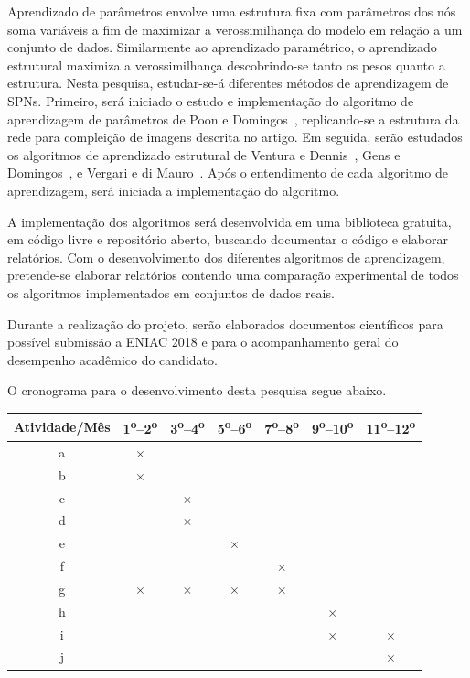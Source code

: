 \documentclass[12pt]{article}
\newcommand{\tsup}{\textsuperscript}
\theoremstyle{plain}
\numberwithin{equation}{section}
\begin{document}
Aprendizado de parâmetros envolve uma estrutura fixa com parâmetros dos nós soma variáveis a fim de
maximizar a verossimilhança do modelo em relação a um conjunto de dados. Similarmente ao
aprendizado paramétrico, o aprendizado estrutural maximiza a verossimilhança descobrindo-se tanto
os pesos quanto a estrutura. Nesta pesquisa, estudar-se-á diferentes métodos de aprendizagem de
SPNs. Primeiro, será iniciado o estudo e implementação do algoritmo de aprendizagem de parâmetros
de Poon e Domingos~\cite{poon-domingos}, replicando-se a estrutura da rede para compleição de
imagens descrita no artigo. Em seguida, serão estudados os algoritmos de aprendizado estrutural
de Ventura e Dennis~\cite{clustering}, Gens e Domingos~\cite{gens-domingos}, e Vergari e di
Mauro~\cite{vergari-mauro}. Após o entendimento de cada algoritmo de aprendizagem, será iniciada a
implementação do algoritmo.

A implementação dos algoritmos será desenvolvida em uma biblioteca gratuita, em código livre e
repositório aberto, buscando documentar o código e elaborar relatórios. Com o desenvolvimento dos
diferentes algoritmos de aprendizagem, pretende-se elaborar relatórios contendo uma comparação
experimental de todos os algoritmos implementados em conjuntos de dados reais.

Durante a realização do projeto, serão elaborados documentos científicos para possível submissão a
ENIAC 2018 e para o acompanhamento geral do desempenho acadêmico do candidato.

O cronograma para o desenvolvimento desta pesquisa segue abaixo.

\begin{table}[h]
  \centering
  \begin{tabular}{|c|c|c|c|c|c|c|}
    \hline
    Atividade/Mês & 1\tsup{o}--2\tsup{o} & 3\tsup{o}--4\tsup{o} & 5\tsup{o}--6\tsup{o} &
    7\tsup{o}--8\tsup{o} & 9\tsup{o}--10\tsup{o} & 11\tsup{o}--12\tsup{o} \\ \hline
    a & $\times$ & & & & & \\ \hline
    b & $\times$ & & & & & \\ \hline
    c & & $\times$ & & & & \\ \hline
    d & & $\times$ & & & & \\ \hline
    e & & & $\times$ & & & \\ \hline
    f & & & & $\times$ & & \\ \hline
    g & $\times$ & $\times$ & $\times$ & $\times$ & & \\ \hline
    h & & & & & $\times$ & \\ \hline
    i & & & & & $\times$ & $\times$ \\ \hline
    j & & & & & & $\times$ \\ \hline
  \end{tabular}
\end{table}
\end{document}
